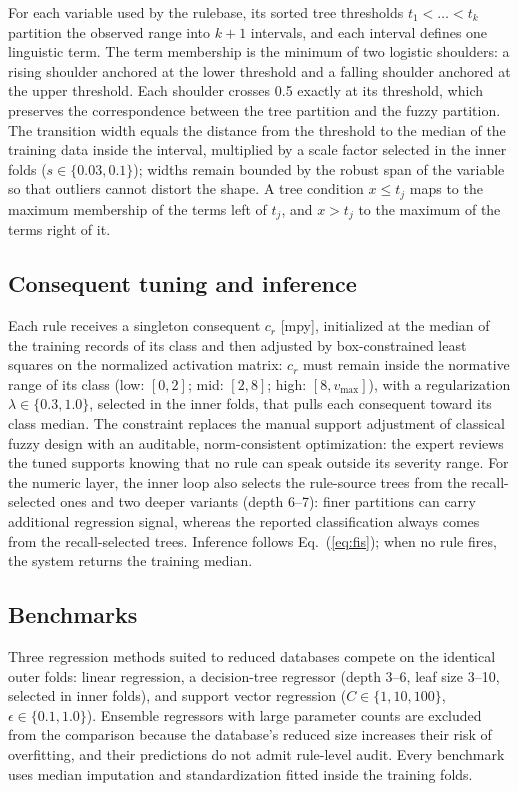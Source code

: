 For each variable used by the rulebase, its sorted tree thresholds $t_1 < \dots < t_k$ partition the observed range into $k+1$ intervals, and each interval defines one linguistic term. The term membership is the minimum of two logistic shoulders: a rising shoulder anchored at the lower threshold and a falling shoulder anchored at the upper threshold. Each shoulder crosses 0.5 exactly at its threshold, which preserves the correspondence between the tree partition and the fuzzy partition. The transition width equals the distance from the threshold to the median of the training data inside the interval, multiplied by a scale factor selected in the inner folds ($s \in \{0.03, 0.1\}$); widths remain bounded by the robust span of the variable so that outliers cannot distort the shape. A tree condition $x \leq t_j$ maps to the maximum membership of the terms left of $t_j$, and $x > t_j$ to the maximum of the terms right of it.

\subsection{Consequent tuning and inference}

Each rule receives a singleton consequent $c_r$ [mpy], initialized at the median of the training records of its class and then adjusted by box-constrained least squares on the normalized activation matrix: $c_r$ must remain inside the normative range of its class (low: $[0,2]$; mid: $[2,8]$; high: $[8, v_{\max}]$), with a regularization $\lambda \in \{0.3, 1.0\}$, selected in the inner folds, that pulls each consequent toward its class median. The constraint replaces the manual support adjustment of classical fuzzy design with an auditable, norm-consistent optimization: the expert reviews the tuned supports knowing that no rule can speak outside its severity range. For the numeric layer, the inner loop also selects the rule-source trees from the recall-selected ones and two deeper variants (depth 6--7): finer partitions can carry additional regression signal, whereas the reported classification always comes from the recall-selected trees. Inference follows Eq.~(\ref{eq:fis}); when no rule fires, the system returns the training median.

\subsection{Benchmarks}

Three regression methods suited to reduced databases compete on the identical outer folds: linear regression, a decision-tree regressor (depth 3--6, leaf size 3--10, selected in inner folds), and support vector regression ($C \in \{1, 10, 100\}$, $\epsilon \in \{0.1, 1.0\}$). Ensemble regressors with large parameter counts are excluded from the comparison because the database's reduced size increases their risk of overfitting, and their predictions do not admit rule-level audit. Every benchmark uses median imputation and standardization fitted inside the training folds. 
